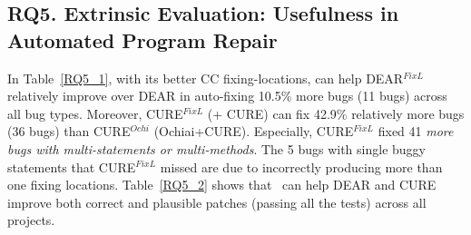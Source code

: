 \subsection{\bf RQ5. Extrinsic Evaluation: Usefulness in Automated Program Repair}
In Table~\ref{RQ5_1}, with its better CC fixing-locations, {\tool} can
help DEAR$^{FixL}$ relatively improve over DEAR in auto-fixing 10.5\%
more bugs (11 bugs) across all bug types.
Moreover, CURE$^{FixL}$ ({\tool}+ CURE) can fix 42.9\%
relatively more bugs (36 bugs) than CURE$^{Ochi}$ (Ochiai+CURE).
Especially, CURE$^{FixL}$ fixed 41 {\em more bugs with
multi-statements or multi-methods}.  The 5 bugs with single buggy
statements that CURE$^{FixL}$ missed are due to {\tool} incorrectly
producing more than one fixing locations.
Table~\ref{RQ5_2} shows that~{\tool} can help DEAR and CURE improve
both correct and plausible patches (passing all the tests) across all
projects.




